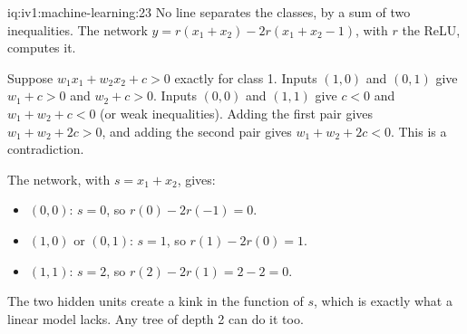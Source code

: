 \begin{solution}{iq:iv1:machine-learning:23}
No line separates the classes, by a sum of two inequalities. The network $y = r(x_1 + x_2) - 2r(x_1 + x_2 - 1)$, with $r$ the ReLU, computes it.

Suppose $w_1x_1 + w_2x_2 + c > 0$ exactly for class 1. Inputs $(1, 0)$ and $(0, 1)$ give $w_1 + c > 0$ and $w_2 + c > 0$. Inputs $(0, 0)$ and $(1, 1)$ give $c < 0$ and $w_1 + w_2 + c < 0$ (or weak inequalities). Adding the first pair gives $w_1 + w_2 + 2c > 0$, and adding the second pair gives $w_1 + w_2 + 2c < 0$. This is a contradiction.

The network, with $s = x_1 + x_2$, gives:
\begin{itemize}
\item $(0, 0)$: $s = 0$, so $r(0) - 2r(-1) = 0$.
\item $(1, 0)$ or $(0, 1)$: $s = 1$, so $r(1) - 2r(0) = 1$.
\item $(1, 1)$: $s = 2$, so $r(2) - 2r(1) = 2 - 2 = 0$.
\end{itemize}
The two hidden units create a kink in the function of $s$, which is exactly what a linear model lacks. Any tree of depth 2 can do it too.



\end{solution}

